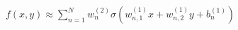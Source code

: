 \documentclass[preview]{standalone}
\begin{document}
\begin{align*}
f(x,y) \approx  \sum_{n=1}^{N} w_n^{(2)} \sigma(w_{n,1}^{(1)}x + w_{n,2}^{(1)}y +b_n^{(1)})
\end{align*}
\end{document}
